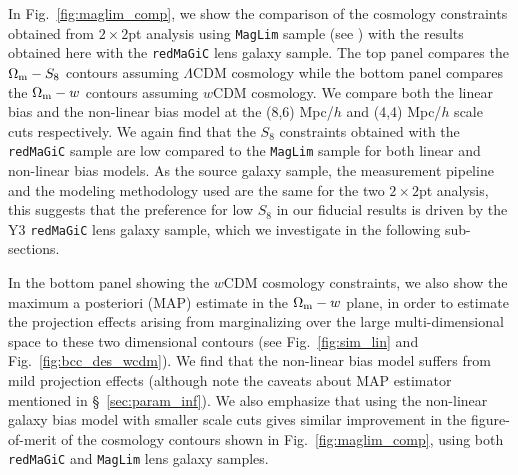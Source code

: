 \documentclass[aps, prd,twocolumn,superscriptaddress,nofootinbib,preprintnumbers]{revtex4-1}
\newcommand{\redmagic}{\texttt{redMaGiC} }
\newcommand{\maglim}{\texttt{MagLim} }
\begin{document}
In Fig.~\ref{fig:maglim_comp}, we show the comparison of the cosmology constraints obtained from $2\times 2$pt analysis using \maglim sample (see \citet*{y3-2x2ptaltlensresults}) with the results obtained here with the \redmagic lens galaxy sample. The top panel compares the $\Omega_{\rm m}- S_8$ contours assuming $\Lambda$CDM cosmology while the bottom panel compares the $\Omega_{\rm m}- w$ contours assuming $w$CDM cosmology. We compare both the linear bias and the non-linear bias model at the (8,6) Mpc/$h$ and (4,4) Mpc/$h$ scale cuts respectively. We again find that the $S_8$ constraints obtained with the \redmagic sample are low compared to the \maglim sample for both linear and non-linear bias models. As the source galaxy sample, the measurement pipeline and the modeling methodology used are the same for the two $2\times 2$pt analysis, this suggests that the preference for low $S_8$ in our fiducial results is driven by the Y3 \redmagic lens galaxy sample, which we investigate in the following sub-sections. 

In the bottom panel showing the $w$CDM cosmology constraints, we also show the maximum a posteriori (MAP) estimate in the $\Omega_{\rm m}- w$ plane, in order to estimate the projection effects arising from marginalizing over the large multi-dimensional space to these two dimensional contours (see Fig.~\ref{fig:sim_lin} and Fig.~\ref{fig:bcc_des_wcdm}). We find that the non-linear bias model suffers from mild projection effects (although note the caveats about MAP estimator mentioned in \S~\ref{sec:param_inf}). We also emphasize that using the non-linear galaxy bias model with smaller scale cuts gives similar improvement in the figure-of-merit of the cosmology contours shown in Fig.~\ref{fig:maglim_comp}, using both \redmagic and \maglim lens galaxy samples. 
\end{document}
